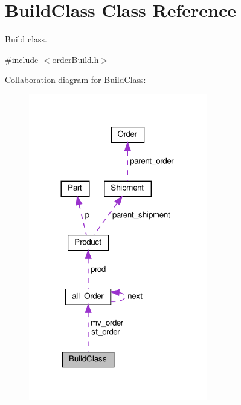 \hypertarget{classBuildClass}{}\section{Build\+Class Class Reference}
\label{classBuildClass}


Build class.  




{\ttfamily \#include $<$order\+Build.\+h$>$}



Collaboration diagram for Build\+Class\+:\nopagebreak
\begin{figure}[H]
\begin{center}
\leavevmode
\includegraphics[width=221pt]{classBuildClass__coll__graph}
\end{center}
\end{figure}
